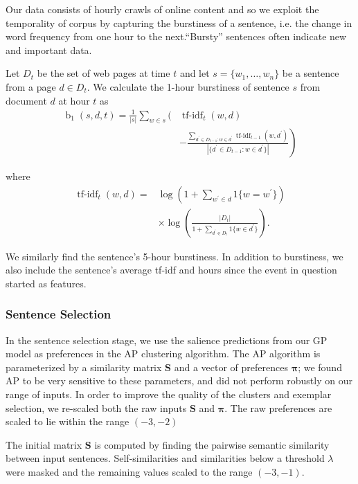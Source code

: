 Our data consists of hourly crawls of online content and so we exploit the
temporality of corpus by capturing the burstiness of a sentence, i.e.  the
change in word frequency from one hour to the next.``Bursty'' sentences often
indicate new and important data. 

Let $D_t$ be the set of web pages at time $t$ and let $s = \{w_1,\ldots,
w_n\}$ be a sentence from a page $d \in D_t$.  We calculate the 1-hour
burstiness of sentence $s$ from document $d$ at hour $t$  as \begin{align*}
\operatorname{b}_1(s,d,t) = \frac{1}{|s|} \sum_{w \in s} \Bigg( &
\operatorname{tf-idf}_t(w,d)  \\ & \left. - \frac{\sum_{d^\prime \in D_{t-1}:
w \in d^\prime } \operatorname{tf-idf}_{t-1}(w,d^\prime)}{|\{d^\prime \in
D_{t-1}: w \in d^\prime\}|} \right) \end{align*}

where \begin{align*} \operatorname{tf-idf}_t(w,d) =&
\log\left(1+\sum_{w^\prime \in d}1\{w=w^\prime\}  \right)\\ & \times
\log\left(\frac{|D_t|}{1 + \sum_{d^\prime \in D_t}1\{w \in d^\prime\}}\right).
\end{align*}


We similarly find the sentence's 5-hour burstiness.  In addition to
burstiness, we also include the sentence's average tf-idf and hours since the
event in question started as features.


\subsubsection{Sentence Selection}\label{subsec:SentenceSelection}

In the sentence selection stage, we use the salience predictions from our GP
model as preferences in the AP clustering algorithm. The AP algorithm is 
parameterized by a similarity matrix $\mathbf{S}$ and a vector of 
preferences $\boldsymbol{\pi}$; we found AP to be very sensitive to these
parameters, and did not perform robustly on our range of inputs.
In order to improve the quality of the clusters and exemplar selection,
we re-scaled both the raw inputs $\mathbf{S}$ and $\boldsymbol{\pi}$. 
The raw preferences are scaled to lie within the  range $(-3, -2)$

The initial matrix $\mathbf{S}$ is computed by finding the pairwise semantic
similarity between input sentences. Self-similarities and similarities below 
a threshold $\lambda$ were masked and the remaining values scaled to the range
$(-3, -1)$.

